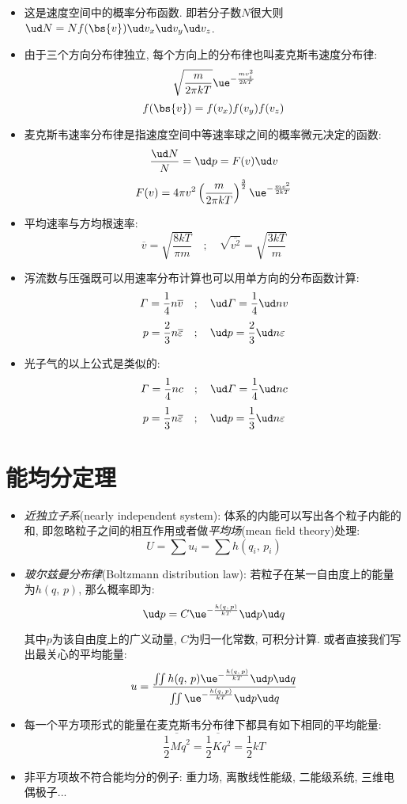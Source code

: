\begin{itemize}
\item 这是速度空间中的概率分布函数. 即若分子数$N$很大则$\ud N = Nf(\bs{v})\ud v_x\ud v_y\ud v_z$.

\item 由于三个方向分布律独立, 每个方向上的分布律也叫麦克斯韦速度分布律:
\[ \sqrt{\frac{m}{2\pi kT}}\ue^{-\frac{mv_i^2}{2kT}}\]
\[f(\bs{v})=f(v_x)f(v_y)f(v_z)\]

\item 麦克斯韦速率分布律是指速度空间中等速率球之间的概率微元决定的函数:
\[\frac{\ud N}{N}=\ud p=F(v)\ud v \]
\[F(v)=4\pi v^2\left(\frac{m}{2\pi kT}\right)^{\frac{3}{2}}\ue^{-\frac{mv^2}{2kT}}\]

\item 平均速率与方均根速率:
\[\overline{v}=\sqrt{\frac{8kT}{\pi m}}\quad ;\quad \sqrt{\overline{v^2}}=\sqrt{\frac{3kT}{m}}\]

\item 泻流数与压强既可以用速率分布计算也可以用单方向的分布函数计算:
\[\varGamma=\frac{1}{4}n\overline{v}\quad ;\quad \ud \varGamma=\frac{1}{4}\ud nv\]
\[p=\frac{2}{3}n\overline{\varepsilon}\quad ;\quad \ud p=\frac{2}{3}\ud n\varepsilon\]

\item 光子气的以上公式是类似的:
\[\varGamma=\frac{1}{4}nc\quad ;\quad \ud \varGamma=\frac{1}{4}\ud nc\]
\[p=\frac{1}{3}n\overline{\varepsilon}\quad ;\quad \ud p=\frac{1}{3}\ud n\varepsilon\]
\end{itemize}

\section{能均分定理}

\begin{itemize}
	\item \emph{近独立子系}(nearly independent system): 体系的内能可以写出各个粒子内能的和, 即忽略粒子之间的相互作用或者做\emph{平均场}(mean field theory)处理:
	\[U=\sum u_i=\sum h(q_i,\,p_i)\]

	\item \emph{玻尔兹曼分布律}(Boltzmann distribution law): 若粒子在某一自由度上的能量为$h(q,\,p)$, 那么概率即为:
	\[\ud p=C\ue^{-\frac{h(q,\,p)}{kT}}\ud p\ud q\]

	其中$p$为该自由度上的广义动量, $C$为归一化常数, 可积分计算. 或者直接我们写出最关心的平均能量:
	\[u=\frac{\iint h(q,\,p)\ue^{-\frac{h(q,\,p)}{kT}}\ud p\ud q}{\iint \ue^{-\frac{h(q,\,p)}{kT}}\ud p\ud q}\]

	\item 每一个平方项形式的能量在麦克斯韦分布律下都具有如下相同的平均能量:
	\[\overline{\frac{1}{2}M\dot{q}^2}=\overline{\frac{1}{2}Kq^2}=\frac{1}{2}kT\]
	\item 非平方项故不符合能均分的例子: 重力场, 离散线性能级, 二能级系统, 三维电偶极子...
\end{itemize}

